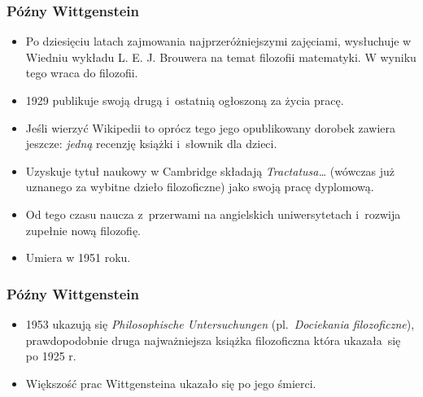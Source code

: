 \documentclass[10pt,t]{beamer}
\begin{document}
\begin{frame}
  \frametitle{Późny Wittgenstein}


  \begin{itemize}

  \item Po dziesięciu latach zajmowania najprzeróżniejszymi
    zajęciami, wysłuchuje w Wiedniu wykładu L. E. J. Brouwera na temat
    filozofii matematyki. W wyniku tego wraca do filozofii.

  \item 1929 publikuje swoją drugą i~ostatnią ogłoszoną za życia
    pracę.

  \item Jeśli wierzyć Wikipedii to oprócz tego jego opublikowany
    dorobek zawiera jeszcze: \textit{jedną} recenzję książki
    i~słownik dla dzieci.

  \item Uzyskuje tytuł naukowy w Cambridge składają \textit{Tractatusa\ldots}
    (wówczas już uznanego za wybitne dzieło filozoficzne) jako
    swoją pracę dyplomową.

  \item Od tego czasu naucza z~przerwami na angielskich uniwersytetach
    i~rozwija zupełnie nową filozofię.

  \item Umiera w 1951 roku.

  \end{itemize}

\end{frame}





\begin{frame}
  \frametitle{Późny Wittgenstein}


  \begin{itemize}

  \item 1953 ukazują się \textit{Philosophische Untersuchungen}
    (pl.~\textit{Dociekania filozoficzne}), prawdopodobnie druga
    najważniejsza książka filozoficzna która ukazała~się po 1925 r.

  \item Większość prac Wittgensteina ukazało się po jego śmierci.

  \end{itemize}

\end{frame}
\end{document}
